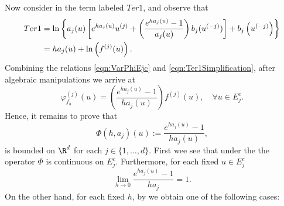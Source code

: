 \documentclass[3p]{elsarticle}
\theoremstyle{definition}
\theoremstyle{plain}%
\theoremstyle{remark}
\begin{document}
\begin{pf}
	Now consider in  the term labeled $Ter1$, and observe that
	\begin{align}
		Ter1&=
			\ln\left\{
				a_j(u)\left[
					e^{ha_j(u)}u^{(j)} +
					\left(
						\frac{e^{ha_j(u)}-1}{a_j(u)}
					\right) b_j(u^{(-j)})	
				\right]
				+b_j\left(u^{(-j)}\right)
			\right\} \notag \\
		&=h a_j(u) + \ln \left( f^{(j)}(u) \right).
		\label{eqn:Ter1Simplification}		
	\end{align}
	Combining the relations \eqref{eqn:VarPhiEjc} and \eqref{eqn:Ter1Simplification},
	after algebraic manipulations we arrive at 
	\begin{equation}\label{eqn:VarPhiBound}
		\varphi_{f_h}^{(j)}(u) =
			\left(
				\frac{e^{ha_j(u)}-1}{h a_j(u)}
			\right)
			f^{(j)}(u), \quad \forall u \in E_j^c.
	\end{equation}
	Hence, it remains to prove that 
	\begin{equation}\label{eqn:ExpBound}
		\Phi(h, a_j)(u):=\frac{e^{ha_j(u)}-1}{ha_j(u)},
	\end{equation}
	is bounded on $\R^d$ for each $j\in \{ 1,\dots, d\}$.
	First wee see that under the  the operator $\Phi$ is continuous
	on $E_j^c$. Furthermore, for each fixed $u\in E_j^c$
	$$
		\lim_{h\to 0}
		\frac{e^{ha_j(u)}-1}{ha_j}=1.
	$$ 
	On the other hand, for each fixed $h$,  by  we obtain 
	one of the following cases:
	

\end{pf}
\end{document}
